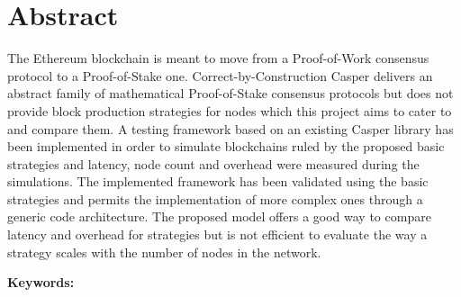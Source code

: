 \chapter*{Abstract}

The Ethereum blockchain is meant to move from a Proof-of-Work consensus protocol
to a Proof-of-Stake one. Correct-by-Construction Casper delivers an abstract
family of mathematical Proof-of-Stake consensus protocols but does not provide
block production strategies for nodes which this project aims to cater to and
compare them. A testing framework based on an existing Casper library has been
implemented in order to simulate blockchains ruled by the proposed basic
strategies and latency, node count and overhead were measured during the
simulations.  The implemented framework has been validated using the basic
strategies and permits the implementation of more complex ones through a generic
code architecture. The proposed model offers a good way to compare latency and
overhead for strategies but is not efficient to evaluate the way a strategy
scales with the number of nodes in the network.


\vskip0.5cm
\noindent\textbf{Keywords:}
\Keywords
